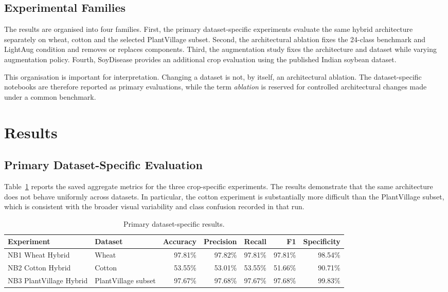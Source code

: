 \documentclass[a4paper,fleqn]{cas-dc}
\begin{document}
\subsection{Experimental Families}
The results are organised into four families. First, the primary dataset-specific experiments evaluate the same hybrid architecture separately on wheat, cotton and the selected PlantVillage subset. Second, the architectural ablation fixes the 24-class benchmark and LightAug condition and removes or replaces components. Third, the augmentation study fixes the architecture and dataset while varying augmentation policy. Fourth, SoyDisease provides an additional crop evaluation using the published Indian soybean dataset.

This organisation is important for interpretation. Changing a dataset is not, by itself, an architectural ablation. The dataset-specific notebooks are therefore reported as primary evaluations, while the term \emph{ablation} is reserved for controlled architectural changes made under a common benchmark.

\section{Results}
\subsection{Primary Dataset-Specific Evaluation}
Table~\ref{tab:primary} reports the saved aggregate metrics for the three crop-specific experiments. The results demonstrate that the same architecture does not behave uniformly across datasets. In particular, the cotton experiment is substantially more difficult than the PlantVillage subset, which is consistent with the broader visual variability and class confusion recorded in that run.

\begin{table}[!t]
\centering
\caption{Primary dataset-specific results.}
\label{tab:primary}
\small
\begin{tabular}{p{3.4cm}lrrrrr}
\toprule
Experiment & Dataset & Accuracy & Precision & Recall & F1 & Specificity \\
\midrule
NB1 Wheat Hybrid & Wheat & 97.81\% & 97.82\% & 97.81\% & 97.81\% & 98.54\% \\
NB2 Cotton Hybrid & Cotton & 53.55\% & 53.01\% & 53.55\% & 51.66\% & 90.71\% \\
NB3 PlantVillage Hybrid & PlantVillage subset & 97.67\% & 97.68\% & 97.67\% & 97.68\% & 99.83\% \\
\bottomrule
\end{tabular}
\end{table}
\end{document}

